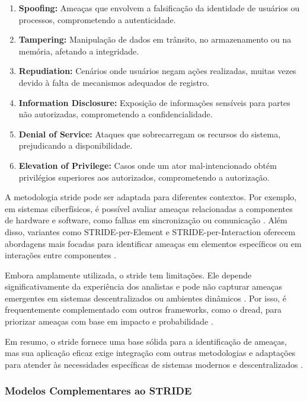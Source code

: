 \begin{enumerate}
    \item \textbf{Spoofing:} Ameaças que envolvem a falsificação da
identidade de usuários ou processos, comprometendo a autenticidade.
    \item \textbf{Tampering:} Manipulação de dados em trânsito, no
armazenamento ou na memória, afetando a integridade.
    \item \textbf{Repudiation:} Cenários onde usuários negam ações
realizadas, muitas vezes devido à falta de mecanismos adequados de
registro.
    \item \textbf{Information Disclosure:} Exposição de informações
sensíveis para partes não autorizadas, comprometendo a
confidencialidade.
    \item \textbf{Denial of Service:} Ataques que sobrecarregam os
recursos do sistema, prejudicando a disponibilidade.
    \item \textbf{Elevation of Privilege:} Casos onde um ator
mal-intencionado obtém privilégios superiores aos autorizados,
comprometendo a autorização.
\end{enumerate}

A metodologia \gls{stride} pode ser adaptada para diferentes contextos. Por
exemplo, em sistemas ciberfísicos, é possível avaliar ameaças
relacionadas a componentes de hardware e software, como falhas em
sincronização ou comunicação
\cite{STRIDEthreatmodelingforcyberphysical}. Além disso, variantes
como STRIDE-per-Element e STRIDE-per-Interaction oferecem abordagens
mais focadas para identificar ameaças em elementos específicos ou em
interações entre componentes \cite{ThreatModelingdesigningForSecurity}.

Embora amplamente utilizada, o \gls{stride} tem limitações. Ele depende
significativamente da experiência dos analistas e pode não capturar
ameaças emergentes em sistemas descentralizados ou ambientes dinâmicos
\cite{SecurityDevelopmentLifecycle}. Por isso, é frequentemente
complementado com outros frameworks, como o \gls{dread}, para priorizar
ameaças com base em impacto e probabilidade \cite{DREADful}.

Em resumo, o \gls{stride} fornece uma base sólida para a identificação de
ameaças, mas sua aplicação eficaz exige integração com outras
metodologias e adaptações para atender às necessidades específicas de
sistemas modernos e descentralizados
\cite{UncoverSecurityDesignFlawsSTRIDE}.

\subsubsection{Modelos Complementares ao STRIDE}
\label{subsubsec:stride_complementary_models}


